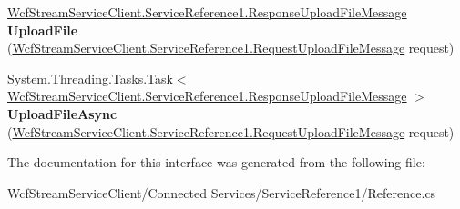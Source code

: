 \begin{DoxyCompactItemize}
\item 
\mbox{\label{interface_wcf_stream_service_client_1_1_service_reference1_1_1_i_strumien_a94b28a1ce50af7d429d3a53ee5c0a029}} 
\hyperlink{class_wcf_stream_service_client_1_1_service_reference1_1_1_response_upload_file_message}{Wcf\+Stream\+Service\+Client.\+Service\+Reference1.\+Response\+Upload\+File\+Message} {\bfseries Upload\+File} (\hyperlink{class_wcf_stream_service_client_1_1_service_reference1_1_1_request_upload_file_message}{Wcf\+Stream\+Service\+Client.\+Service\+Reference1.\+Request\+Upload\+File\+Message} request)
\item 
\mbox{\label{interface_wcf_stream_service_client_1_1_service_reference1_1_1_i_strumien_af4db6a7dd89d30d0244d9d91e4d012d1}} 
System.\+Threading.\+Tasks.\+Task$<$ \hyperlink{class_wcf_stream_service_client_1_1_service_reference1_1_1_response_upload_file_message}{Wcf\+Stream\+Service\+Client.\+Service\+Reference1.\+Response\+Upload\+File\+Message} $>$ {\bfseries Upload\+File\+Async} (\hyperlink{class_wcf_stream_service_client_1_1_service_reference1_1_1_request_upload_file_message}{Wcf\+Stream\+Service\+Client.\+Service\+Reference1.\+Request\+Upload\+File\+Message} request)
\end{DoxyCompactItemize}


The documentation for this interface was generated from the following file\+:\begin{DoxyCompactItemize}
\item 
Wcf\+Stream\+Service\+Client/\+Connected Services/\+Service\+Reference1/Reference.\+cs\end{DoxyCompactItemize}
